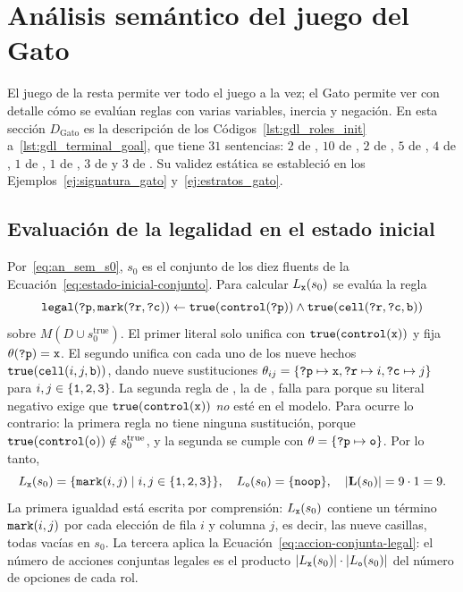 \section{Análisis semántico del juego del Gato}
\label{sec:an_ejemplo_gato}

El juego de la resta permite ver todo el juego a la vez; el Gato permite ver con detalle cómo se evalúan reglas con varias variables, inercia y negación. En esta sección $D_{\text{Gato}}$ es la descripción de los Códigos~\ref{lst:gdl_roles_init} a~\ref{lst:gdl_terminal_goal}, que tiene $31$ sentencias: $2$ de , $10$ de , $2$ de , $5$ de , $4$ de , $1$ de , $1$ de , $3$ de  y $3$ de . Su validez estática se estableció en los Ejemplos~\ref{ej:signatura_gato} y~\ref{ej:estratos_gato}.

\subsection{Evaluación de la legalidad en el estado inicial}

Por~\eqref{eq:an_sem_s0}, $s_0$ es el conjunto de los diez fluents de la Ecuación~\eqref{eq:estado-inicial-conjunto}. Para calcular $L_{\texttt{x}}(s_0)$ se evalúa la regla
\begin{equation*}
    \texttt{legal}(\texttt{?p}, \texttt{mark}(\texttt{?r}, \texttt{?c})) \leftarrow \texttt{true}(\texttt{control}(\texttt{?p})) \land \texttt{true}(\texttt{cell}(\texttt{?r}, \texttt{?c}, \texttt{b}))
\end{equation*}
sobre $M(D \cup s_0^{\mathrm{true}})$. El primer literal solo unifica con $\texttt{true}(\texttt{control}(\texttt{x}))$ y fija $\theta(\texttt{?p}) = \texttt{x}$. El segundo unifica con cada uno de los nueve hechos $\texttt{true}(\texttt{cell}(i, j, \texttt{b}))$, dando nueve sustituciones $\theta_{ij} = \{\texttt{?p} \mapsto \texttt{x}, \texttt{?r} \mapsto i, \texttt{?c} \mapsto j\}$ para $i, j \in \{\texttt{1}, \texttt{2}, \texttt{3}\}$. La segunda regla de , la de , falla para  porque su literal negativo exige que $\texttt{true}(\texttt{control}(\texttt{x}))$ \emph{no} esté en el modelo. Para  ocurre lo contrario: la primera regla no tiene ninguna sustitución, porque $\texttt{true}(\texttt{control}(\texttt{o})) \notin s_0^{\mathrm{true}}$, y la segunda se cumple con $\theta = \{\texttt{?p} \mapsto \texttt{o}\}$. Por lo tanto,
\begin{equation*}
    L_{\texttt{x}}(s_0) = \{\texttt{mark}(i, j) \mid i, j \in \{\texttt{1}, \texttt{2}, \texttt{3}\}\},
    \quad
    L_{\texttt{o}}(s_0) = \{\texttt{noop}\},
    \quad
    |\mathbf L(s_0)| = 9 \cdot 1 = 9.
\end{equation*}
La primera igualdad está escrita por comprensión: $L_{\texttt{x}}(s_0)$ contiene un término $\texttt{mark}(i, j)$ por cada elección de fila $i$ y columna $j$, es decir, las nueve casillas, todas vacías en $s_0$. La tercera aplica la Ecuación~\eqref{eq:accion-conjunta-legal}: el número de acciones conjuntas legales es el producto $|L_{\texttt{x}}(s_0)| \cdot |L_{\texttt{o}}(s_0)|$ del número de opciones de cada rol.

